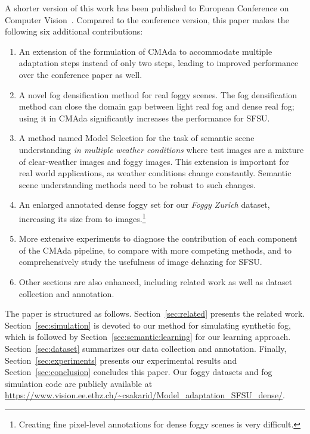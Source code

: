 \documentclass[twocolumn]{svjour3}          \smartqed  \usepackage{graphicx}
\begin{document}
A shorter version of this work has been published to European Conference on Computer Vision~\cite{dense:SFSU:eccv18}. Compared to the conference version, this paper makes the following six additional contributions: 
\begin{enumerate}
    \item An extension of the formulation of CMAda to accommodate multiple adaptation steps instead of only two steps, leading to improved performance over the conference paper as well.
    \item A novel fog densification method for real foggy scenes. The fog densification method can close the domain gap between light real fog and dense real fog; using it in CMAda significantly increases the performance for SFSU.
    \item A method named Model Selection for the task of semantic scene understanding \emph{in multiple weather conditions} where test images are a mixture of clear-weather images and foggy images. This extension is important for real world applications, as weather conditions change constantly. Semantic scene understanding methods need to be robust to such changes.
    \item An enlarged annotated dense foggy set for our \emph{Foggy Zurich} dataset, increasing its size from  to  images.\footnote{Creating fine pixel-level annotations for dense foggy scenes is very difficult.}
    \item More extensive experiments to diagnose the contribution of each component of the CMAda pipeline, to compare with more competing methods, and to comprehensively study the usefulness of image dehazing for SFSU. 
    \item Other sections are also enhanced, including related work as well as dataset collection and annotation. 
\end{enumerate}

The paper is structured as follows. Section~\ref{sec:related} presents the related work. Section~\ref{sec:simulation} is devoted to our method for simulating synthetic fog, which is followed by Section~\ref{sec:semantic:learning} for our learning approach. Section~\ref{sec:dataset} summarizes our data collection and annotation. Finally, Section~\ref{sec:experiments} presents our experimental results and Section~\ref{sec:conclusion} concludes this paper. Our foggy datasets and fog simulation code are publicly available at \url{https://www.vision.ee.ethz.ch/~csakarid/Model_adaptation_SFSU_dense/}.
\end{document}
